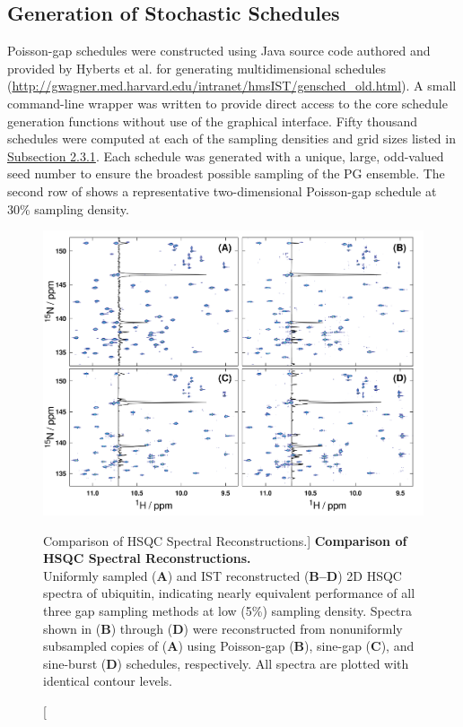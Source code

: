 \subsection{Generation of Stochastic Schedules}

\begin{doublespace}
Poisson-gap schedules were constructed using Java source code authored and
provided by Hyberts et al. for generating multidimensional schedules
(\url{http://gwagner.med.harvard.edu/intranet/hmsIST/gensched_old.html}).
A small command-line wrapper was written to provide direct access to the
core schedule generation functions without use of the graphical interface.
Fifty thousand schedules were computed at each of the sampling densities
and grid sizes listed in \hyperlink{subsection.2.3.1}{Subsection 2.3.1}.
Each schedule was generated with a unique, large, odd-valued seed number
to ensure the broadest possible sampling of the PG ensemble. The second
row of  shows a representative two-dimensional
Poisson-gap schedule at 30\% sampling density.
\end{doublespace}

\begin{figure}[ht!]
\includegraphics[width=6.5in]{figs/dgs/06-hsqc.png}
\caption
      [Comparison of HSQC Spectral Reconstructions.]{
  {\bf Comparison of HSQC Spectral Reconstructions.}
  \\
  Uniformly sampled ({\bf A}) and IST reconstructed ({\bf B--D}) 2D \hnnmr{}
  HSQC spectra of ubiquitin, indicating nearly equivalent performance of all
  three gap sampling methods at low (5\%) sampling density. Spectra shown in
  ({\bf B}) through ({\bf D}) were reconstructed from nonuniformly subsampled
  copies of ({\bf A}) using Poisson-gap ({\bf B}), sine-gap ({\bf C}), and
  sine-burst ({\bf D}) schedules, respectively. All spectra are plotted with
  identical contour levels.
}
\label{figure.2.6}
\end{figure}

